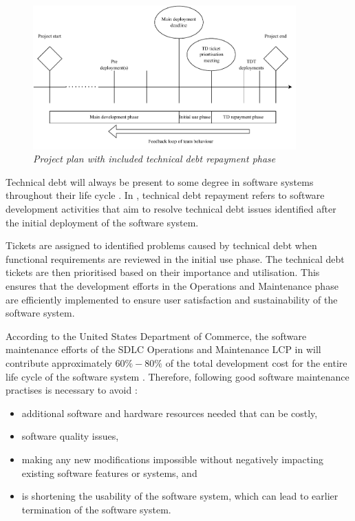 \begin{figure}[!htb]
	\centering %
	\includegraphics[width=0.9\textwidth]{img/Chapter1/TD_repayment/TD_repayment.pdf}
	\caption[Project plan with included technical debt repayment phase]
	{\textit{Project plan with included technical debt repayment phase \cite{Wiese2021}}}\label{fig:ch1_tdRepayment}
\end{figure} 

Technical debt will always be present to some degree in software systems throughout their life cycle \cite{Wiese2021}. In , technical debt repayment refers to software development activities that aim to resolve technical debt issues identified after the initial deployment of the software system.\par Tickets are assigned to identified problems caused by technical debt when functional requirements are reviewed in the initial use phase. The technical debt tickets are then prioritised based on their importance and utilisation. This ensures that the development efforts in the Operations and Maintenance phase are efficiently implemented to ensure user satisfaction and sustainability of the software system.

\clearpage

According to the United States Department of Commerce, the software maintenance efforts of the SDLC Operations and Maintenance LCP in  will contribute approximately $60\%-80\%$ of the total development cost for the entire life cycle of the software system \cite{Ogheneovo2014, Ackermann2009, Tang2010}. Therefore, following good software maintenance practises is necessary to avoid \cite{DeLeon-Sigg2020}:

\begin{itemize}
	\item additional software and hardware resources needed that can be costly,
	\item software quality issues,
	\item making any new modifications impossible without negatively impacting existing software features or systems, and
	\item is shortening the usability of the software system, which can lead to earlier termination of the software system.
\end{itemize}

